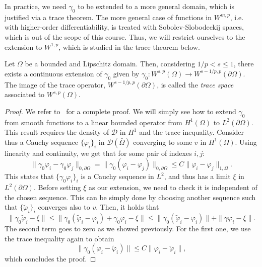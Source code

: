 In practice, we need $\gamma_0$ to be extended to a more general domain, which is justified via a trace theorem. The more general case of functions in $W^{m,p}$, i.e. with higher-order differentiability, is treated with Sobolev-Slobodeckij spaces, which is out of the scope of this course. Thus, we will restrict ourselves to the extension to $W^{1,p}$, which is studied in the trace theorem below.
\begin{theorem}\label{thm:trace-theorem}
    Let $\Omega$ be a bounded and Lipschitz domain. Then, considering $1/p < s \leq 1$, there exists a continuous extension of $\gamma_0$ given by $\gamma_0: W^{s,p}(\Omega) \to W^{s-1/p, p}(\partial\Omega)$. The image of the trace operator, $W^{s-1/p, p}(\partial\Omega)$, is called the \emph{trace space} associated to $W^{s,p}(\Omega)$.
    \begin{proof}
        We refer to~\cite{adams2003sobolev} for a complete proof. We will simply see how to extend $\gamma_0$ from smooth functions to a linear bounded operator from $H^1(\Omega)$ to $L^2(\partial\Omega)$. This result requires the density of $\mathcal D$ in $H^1$ and the trace inequality. Consider thus a Cauchy sequence $\{\varphi_i\}_i$ in $\mathcal D(\bar\Omega)$ converging to some $v$ in $H^1(\Omega)$. Using linearity and continuity, we get that for some pair of indexes $i,j$: 
        \begin{equation*}
            \| \gamma_0 \varphi_i - \gamma_0 \varphi_j \|_{0,\partial\Omega} = \| \gamma_0 (\varphi_i - \varphi_j) \|_{0,\partial\Omega} \leq C \| \varphi_i - \varphi_j \|_{1,\Omega}.
        \end{equation*}
        This states that $\{ \gamma_0 \varphi_i \}_i $ is a Cauchy sequence in $L^2$, and thus has a limit $\xi$ in $L^2(\partial\Omega)$. Before setting $\xi$ as our extension, we need to check it is independent of the chosen sequence. This can be simply done by choosing another sequence such that $\{\tilde \varphi_i\}_i$ converges also to $v$. Then, it holds that 
        \begin{equation*}
            \| \gamma_0 \tilde \varphi_i - \xi \| \leq \| \gamma_0(\tilde\varphi_i - \varphi_i) + \gamma_0 \varphi_i - \xi \| \leq \| \gamma_0(\tilde\varphi_i - \varphi_i) \| + \| \gamma\varphi_i - \xi \|.
        \end{equation*}
        The second term goes to zero as we showed previously. For the first one, we use the trace inequality again to obtain 
        \begin{equation*}
            \| \gamma_0(\varphi_i - \tilde\varphi_i) \| \leq C \|\varphi_i - \tilde \varphi_i \|,
        \end{equation*}
        which concludes the proof. 
    \end{proof}
\end{theorem}

